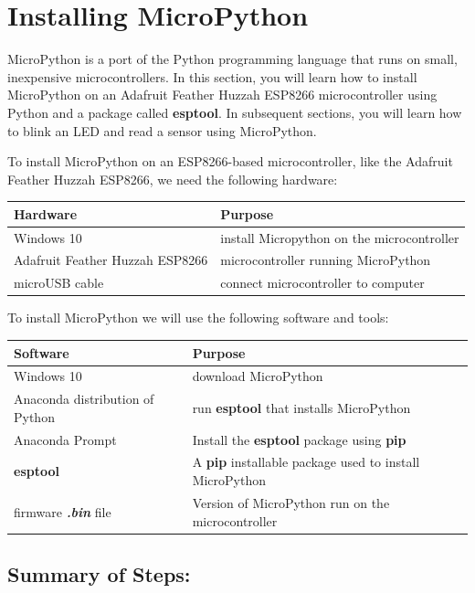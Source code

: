 \documentclass{book}
\begin{document}
    
        \section{Installing MicroPython}\label{installing-micropython}
    




    
        MicroPython is a port of the Python programming language that runs on
small, inexpensive microcontrollers. In this section, you will learn how
to install MicroPython on an Adafruit Feather Huzzah ESP8266
microcontroller using Python and a package called \textbf{esptool}. In
subsequent sections, you will learn how to blink an LED and read a
sensor using MicroPython.
    




    
        To install MicroPython on an ESP8266-based microcontroller, like the
Adafruit Feather Huzzah ESP8266, we need the following hardware:

\begin{longtable}[]{@{}ll@{}}
\toprule
Hardware & Purpose\tabularnewline
\midrule
\endhead
Windows 10 & install Micropython on the microcontroller\tabularnewline
Adafruit Feather Huzzah ESP8266 & microcontroller running
MicroPython\tabularnewline
microUSB cable & connect microcontroller to computer\tabularnewline
\bottomrule
\end{longtable}

To install MicroPython we will use the following software and tools:

\begin{longtable}[]{@{}ll@{}}
\toprule
Software & Purpose\tabularnewline
\midrule
\endhead
Windows 10 & download MicroPython\tabularnewline
Anaconda distribution of Python & run \textbf{esptool} that installs
MicroPython\tabularnewline
Anaconda Prompt & Install the \textbf{esptool} package using
\textbf{pip}\tabularnewline
\textbf{esptool} & A \textbf{pip} installable package used to install
MicroPython\tabularnewline
firmware \textbf{\emph{.bin}} file & Version of MicroPython run on the
microcontroller\tabularnewline
\bottomrule
\end{longtable}
    




    
        \subsection{Summary of Steps:}\label{summary-of-steps}
    
\end{document}
